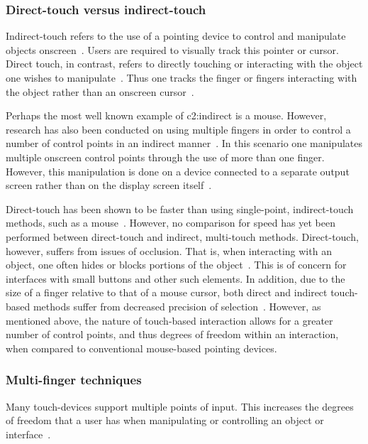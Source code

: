 \subsubsection{Direct-touch versus indirect-touch}
Indirect-touch refers to the use of a pointing device to control and manipulate objects onscreen~\citep{Mosc08}. Users are required to visually track this pointer or cursor. Direct touch, in contrast, refers to directly touching or interacting with the object one wishes to manipulate~\citep{Kin09}. Thus one tracks the finger or fingers interacting with the object rather than an onscreen cursor~\citep{MoscH06}. 

Perhaps the most well known example of \gls{c2:indirect} is a mouse. However, research has also been conducted on using multiple fingers in order to control a number of control points in an indirect manner~\citep{MoscH06,Mosc08}. In this scenario one manipulates multiple onscreen control points through the use of more than one finger. However, this manipulation is done on a device connected to a separate output screen rather than on the display screen itself~\citep{MoscH06}.

Direct-touch has been shown to be faster than using single-point, indirect-touch methods, such as a mouse~\citep{Kin09}. However, no comparison for speed has yet been performed between direct-touch and indirect, multi-touch methods. Direct-touch, however, suffers from issues of occlusion. That is, when interacting with an object, one often hides or blocks portions of the object~\citep{Kin09}. This is of concern for interfaces with small buttons and other such elements. In addition, due to the size of a finger relative to that of a mouse cursor, both direct and indirect touch-based methods suffer from decreased precision of selection~\citep{Kin09}. However, as mentioned above, the nature of touch-based interaction allows for a greater number of control points, and thus degrees of freedom within an interaction, when compared to conventional mouse-based pointing devices.

\subsubsection{Multi-finger techniques}
Many touch-devices support multiple points of input. This increases the degrees of freedom that a user has when manipulating or controlling an object or interface~\citep{Mosc08}.

